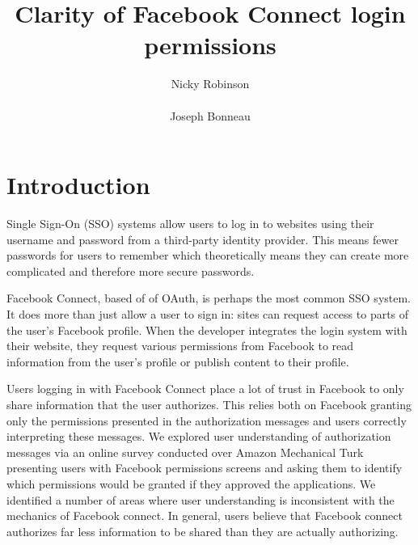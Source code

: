 \documentclass[twoside,letterpaper]{soups-poster}
\begin{document}
%

\title{Clarity of Facebook Connect login permissions}

\author{
\alignauthor
Nicky Robinson\\
       \\
\alignauthor
Joseph Bonneau
       \\
}

\maketitle


\section{Introduction}
Single Sign-On (SSO) systems allow users to log in to websites using their username and password from a third-party identity provider.
This means fewer passwords for users to remember which theoretically means they can create more complicated and therefore more secure passwords.

Facebook Connect, based of of OAuth, is perhaps the most common SSO system.
It does more than just allow a user to sign in: sites can request access to parts of the user's Facebook profile.
When the developer integrates the login system with their website, they request various permissions from Facebook to read information from the user's profile or publish content to their profile. %

Users logging in with Facebook Connect place a lot of trust in Facebook to only share information that the user authorizes.
This relies both on Facebook granting only the permissions presented in the authorization messages and users correctly interpreting these messages.
We explored user understanding of authorization messages via an online survey conducted over Amazon Mechanical Turk presenting users with Facebook permissions screens and asking them to identify which permissions would be granted if they approved the applications.
We identified a number of areas where user understanding is inconsistent with the mechanics of Facebook connect.
In general, users believe that Facebook connect authorizes far less information to be shared than they are actually authorizing.
\end{document}
